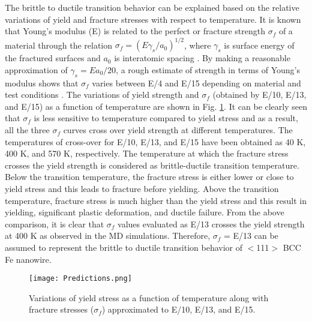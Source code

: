 \documentclass[%
reprint,%
 amssymb, amsmath,%
 aip,apl,%
]{revtex4-1}
\begin{document}
The brittle to ductile transition behavior can be explained based on the relative variations of yield and fracture stresses with 
respect to temperature. It is known that Young’s modulus (E) is related to the perfect or fracture strength $\sigma_f$ of a material 
through the relation $\sigma_{f} = (E\gamma_s/a_0)^{1/2}$, where $\gamma_s$ is surface energy of the fractured surfaces and $a_0$ is 
interatomic spacing \cite{Dieter}. By making a reasonable approximation of $\gamma_s = Ea_0/20$, a rough estimate of strength in 
terms of Young’s modulus shows that $\sigma_f$ varies between E/4 and E/15 depending on material and test conditions \cite{Dieter}. 
The variations of yield strength and $\sigma_f$ (obtained by E/10, E/13, and E/15) as a function of temperature are shown in Fig. 
\ref{Predictions}. It can be clearly seen that $\sigma_f$ is less sensitive to temperature compared to yield stress and as a result, 
all the three $\sigma_f$ curves cross over yield strength at different temperatures. The temperatures of cross-over for E/10, E/13, 
and E/15 have been obtained as 40 K, 400 K, and 570 K, respectively. The temperature at which the fracture stress crosses the yield 
strength is considered as brittle-ductile transition temperature. Below the transition temperature, the fracture stress is either 
lower or close to yield stress and this leads to fracture before yielding. Above the transition temperature, fracture stress is much
higher than the yield stress and this result in yielding, significant plastic deformation, and ductile failure. From the above 
comparison, it is clear that $\sigma_f$ values evaluated as E/13 crosses the yield strength at 400 K as observed in the MD simulations. 
Therefore, $\sigma_f$ = E/13 can be assumed to represent the brittle to ductile transition behavior of $<$111$>$ BCC Fe nanowire.

\begin{figure}
\centering
\texttt{[image: Predictions.png]}
\caption {Variations of yield stress as a function of temperature along with fracture stresses ($\sigma_f$) approximated to E/10, 
E/13, and E/15.}
\label{Predictions}
\end{figure}
\end{document}
